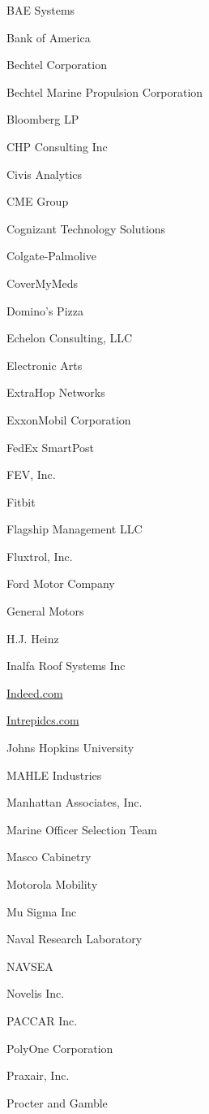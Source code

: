 \documentclass[twoside]{article}
\begin{document}
\begin{center}
\begin{multicols}{5}
\begin{FlushLeft}
\begin{compactitem}
\item BAE Systems
\item Bank of America
\item Bechtel Corporation
\item Bechtel Marine Propulsion Corporation
\item Bloomberg LP
\item CHP Consulting Inc
\item Civis Analytics
\item CME Group
\item Cognizant Technology Solutions
\item Colgate-Palmolive
\item CoverMyMeds
\item Domino's Pizza
\item Echelon Consulting, LLC
\item Electronic Arts
\item ExtraHop Networks
\item ExxonMobil Corporation
\item FedEx SmartPost
\item FEV, Inc.
\item Fitbit
\item Flagship Management LLC
\item Fluxtrol, Inc.
\item Ford Motor Company
\item General Motors
\item H.J. Heinz
\item Inalfa Roof Systems Inc
\item \url{Indeed.com}
\item \url{Intrepidcs.com}
\item Johns Hopkins University
\item MAHLE Industries
\item Manhattan Associates, Inc.
\item Marine Officer Selection Team
\item Masco Cabinetry
\item Motorola Mobility
\item Mu Sigma Inc
\item Naval Research Laboratory
\item NAVSEA
\item Novelis Inc.
\item PACCAR Inc.
\item PolyOne Corporation
\item Praxair, Inc.
\item Procter and Gamble

\end{compactitem}
\end{FlushLeft}
\end{multicols}
\end{center}
\end{document}
